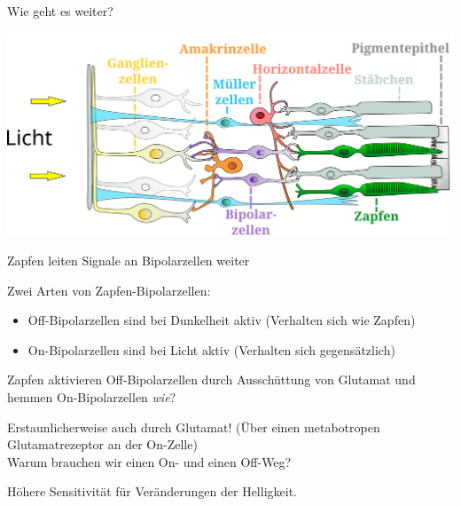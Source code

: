 \documentclass{beamer}
\begin{document}
\begin{frame}{Wie geht es weiter?}

\begin{center}
    \includegraphics[width=\textwidth]{Retina_de.png}
\end{center}

\end{frame}



\begin{frame}{Zapfen leiten Signale an Bipolarzellen weiter}

Zwei Arten von Zapfen-Bipolarzellen: 

\begin{itemize}
    \item 
    Off-Bipolarzellen sind bei Dunkelheit aktiv (Verhalten sich wie Zapfen)
    \item
    On-Bipolarzellen sind bei Licht aktiv (Verhalten sich gegensätzlich)
\end{itemize}

\pause

Zapfen aktivieren Off-Bipolarzellen durch Ausschüttung von Glutamat und hemmen On-Bipolarzellen \emph{wie}?

\pause

Erstaunlicherweise auch durch Glutamat! (Über einen metabotropen Glutamatrezeptor an der On-Zelle) \\[0.5 cm]


\pause
Warum brauchen wir einen On- und einen Off-Weg?

Höhere Sensitivität für Veränderungen der Helligkeit.  \\


\end{frame}



    
    
\end{document}
